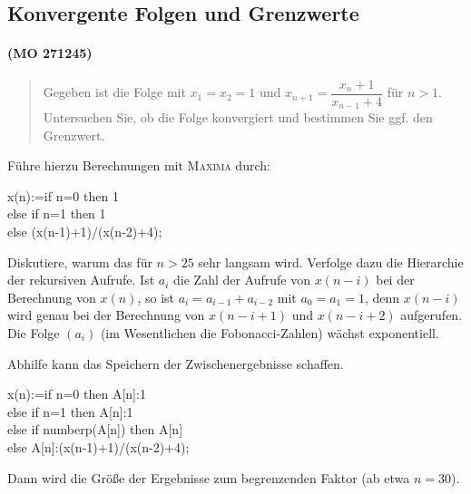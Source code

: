 \documentclass[11pt,a4paper]{article}
\newcommand{\cas}[1]{\textsc{#1}}
\begin{document}
\subsection*{Konvergente Folgen und Grenzwerte}

\paragraph{(MO 271245)}
\begin{quote}
  Gegeben ist die Folge mit $x_1=x_2=1$ und $x_{n+1}=\dfrac{x_n+1}{x_{n-1}+4}$
  für $n>1$.  Untersuchen Sie, ob die Folge konvergiert und bestimmen Sie ggf.
  den Grenzwert.
\end{quote}
Führe hierzu Berechnungen mit \cas{Maxima} durch:
\begin{code}
  x(n):=if n=0 then 1\\
  else if n=1 then 1\\
  else (x(n-1)+1)/(x(n-2)+4);
\end{code}
Diskutiere, warum das für $n>25$ sehr langsam wird.  Verfolge dazu die
Hierarchie der rekursiven Aufrufe.  Ist $a_i$ die Zahl der Aufrufe von
$x(n-i)$ bei der Berechnung von $x(n)$, so ist $a_i=a_{i-1}+a_{i-2}$ mit
$a_0=a_1=1$, denn $x(n-i)$ wird genau bei der Berechnung von $x(n-i+1)$ und
$x(n-i+2)$ aufgerufen.  Die Folge $(a_i)$ (im Wesentlichen die
Fobonacci-Zahlen) wächst exponentiell.

Abhilfe kann das Speichern der Zwischenergebnisse schaffen. 
\begin{code}
  x(n):=if n=0 then A[n]:1\\
  else if n=1 then A[n]:1\\
  else if numberp(A[n]) then A[n]\\
  else A[n]:(x(n-1)+1)/(x(n-2)+4);
\end{code}
Dann wird die Größe der Ergebnisse zum begrenzenden Faktor (ab etwa $n=30$). 
\end{document}
